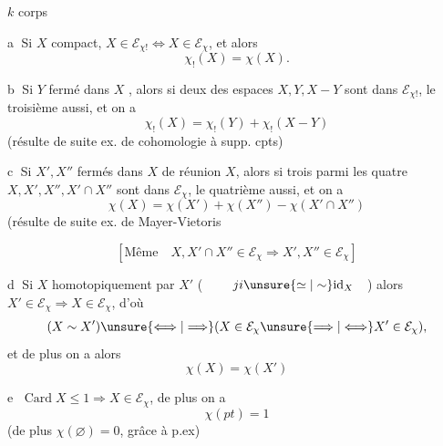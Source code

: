 
$k$ corps


\textcircled{a}  Si $X$ compact, $X\in\mathcal{E}_{\chi!}\Longleftrightarrow X\in\mathcal{E}_{\chi}$, et alors
\[
\chi_!(X)=\chi(X).
\]

\textcircled{b} Si $Y$ fermé dans $X$ , alors si deux des espaces $X,Y,X-Y$ sont dans $\mathcal{E}_{\chi!}$, le troisième aussi, et on a
\[
\chi_!(X)=\chi_!(Y)+\chi_!(X-Y)
\]
(résulte de suite ex. de cohomologie à supp. cpts)

\textcircled{c} Si $X',X''$ fermés dans $X$ de réunion $X$, alors si trois parmi les quatre  $X,X',X'',X'\cap X''$ sont dans $\mathcal{E}_{\chi}$, le quatrième aussi, et on a
\[
\chi(X)=\chi(X')+\chi(X'')-\chi(X'\cap X'')
\]
(résulte de suite ex. de Mayer-Vietoris

\[
[\text{Même}\quad X,X'\cap X''\in\mathcal{E}_{\chi}\Longrightarrow X',X''\in\mathcal{E}_{\chi}]
\]

\textcircled{d} Si $X$   homotopiquement par $X'$
(
$\qquad ji\unsure{\simeq|\sim}\mathrm{id}_X\quad$) alors $X'\in\mathcal{E}_{\chi}\Longrightarrow X\in\mathcal{E}_{\chi}$, d'où
\[
(X\sim X')\unsure{\Longleftrightarrow|\Longrightarrow}(X\in\mathcal{E}_{\chi}\unsure{\Longrightarrow|\Longleftrightarrow}X'\in\mathcal{E}_{\chi}),
\]
et de plus on a alors
\[
\chi(X)=\chi(X')
\]

\textcircled{e}  $\operatorname{Card}X\leq1\Longrightarrow X\in\mathcal{E}_{\chi}$, de plus on a
\[
\chi(pt)=1
\]
(de plus $\chi(\varnothing)=0$, grâce à  p.ex) 


